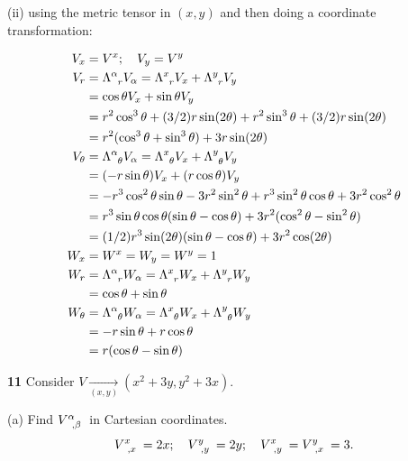 \message{ !name(gr-ch5-notes.tex)}\documentclass[gr-notes.tex]{subfiles}
\begin{document}
(ii)
using the metric tensor in $(x,y)$ and then doing a coordinate transformation:

\begin{align*}
  V_x &= V^x; \quad V_y = V^y
  \\
  V_r &=
  \tensor{\Lambda}{^\alpha_r} V_\alpha =
  \tensor{\Lambda}{^x_r} V_x + \tensor{\Lambda}{^y_r} V_y
  \\ &=
  \cos\theta V_x + \sin\theta V_y
  \\ &=
  r^2 \cos^3\theta + (3/2) r \sin(2\theta) +
  r^2 \sin^3\theta + (3/2) r \sin(2\theta)
  \\ &=
  r^2 (\cos^3\theta + \sin^3\theta) + 3 r \sin(2\theta)
  \\
  V_\theta &=
  \tensor{\Lambda}{^\alpha_\theta} V_\alpha =
  \tensor{\Lambda}{^x_\theta} V_x + \tensor{\Lambda}{^y_\theta} V_y
  \\ &=
  (-r \sin\theta) V_x + (r \cos\theta) V_y
  \\ &=
  -r^3 \cos^2\theta \sin\theta - 3 r^2 \sin^2\theta +
   r^3 \sin^2\theta \cos\theta + 3 r^2 \cos^2\theta
  \\ &=
  r^3 \sin\theta \cos\theta (\sin\theta - \cos\theta) +
  3 r^2 (\cos^2\theta - \sin^2\theta)
  \\ &=
  (1/2) r^3 \sin(2\theta) (\sin\theta - \cos\theta) +
  3 r^2 \cos(2\theta)
  \\
  W_x &= W^x = W_y = W^y = 1
  \\
  W_r &=
  \tensor{\Lambda}{^\alpha_r} W_\alpha =
  \tensor{\Lambda}{^x_r} W_x + \tensor{\Lambda}{^y_r} W_y
  \\ &=
  \cos\theta + \sin\theta
  \\
  W_\theta &=
  \tensor{\Lambda}{^\alpha_\theta} W_\alpha =
  \tensor{\Lambda}{^x_\theta} W_x + \tensor{\Lambda}{^y_\theta} W_y
  \\ &=
  -r \sin\theta + r \cos\theta
  \\ &=
  r (\cos\theta - \sin\theta)
\end{align*}


\textbf{11}
Consider $V \underset{(x,y)}{\to} (x^2 + 3y, y^2 + 3x)$.

(a)
Find $\tensor{V}{^\alpha_{,\beta}}$ in Cartesian coordinates.
%
\begin{displaymath}
  \tensor{V}{^x_{,x}} = 2 x; \quad
  \tensor{V}{^y_{,y}} = 2 y; \quad
  \tensor{V}{^x_{,y}} = \tensor{V}{^y_{,x}} = 3.
\end{displaymath}
\end{document}
